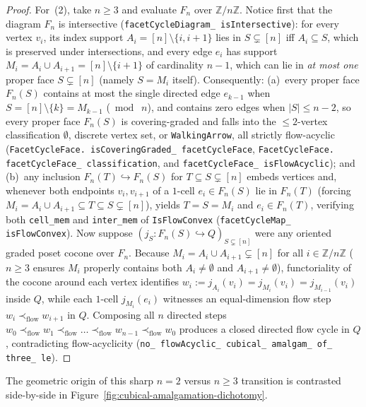 \begin{proof}
For~(2), take $n \ge 3$ and evaluate $F_n$ over $\mathbb{Z}/n\mathbb{Z}$. Notice first that the diagram $F_n$ is intersective (\texttt{facetCycleDiagram\_ isIntersective}): for every vertex $v_i$, its index support $A_i = [n] \setminus \{i, i+1\}$ lies in $S \subsetneq [n]$ iff $A_i \subseteq S$, which is preserved under intersections, and every edge $e_i$ has support $M_i = A_i \cup A_{i+1} = [n] \setminus \{i+1\}$ of cardinality $n - 1$, which can lie in \emph{at most one} proper face $S \subsetneq [n]$ (namely $S = M_i$ itself). Consequently: (a)~every proper face $F_n(S)$ contains at most the single directed edge $e_{k-1}$ when $S = [n] \setminus \{k\} = M_{k-1}$ ($\bmod\; n$), and contains zero edges when $|S| \le n - 2$, so every proper face $F_n(S)$ is covering-graded and falls into the $\le 2$-vertex classification $\emptyset$, discrete vertex set, or \texttt{WalkingArrow}, all strictly flow-acyclic (\texttt{FacetCycleFace. isCoveringGraded\_ facetCycleFace}, \texttt{FacetCycleFace. facetCycleFace\_ classification}, and \texttt{facetCycleFace\_ isFlowAcyclic}); and (b)~any inclusion $F_n(T) \hookrightarrow F_n(S)$ for $T \subseteq S \subsetneq [n]$ embeds vertices and, whenever both endpoints $v_i, v_{i+1}$ of a $1$-cell $e_i \in F_n(S)$ lie in $F_n(T)$ (forcing $M_i = A_i \cup A_{i+1} \subseteq T \subseteq S \subsetneq [n]$), yields $T = S = M_i$ and $e_i \in F_n(T)$, verifying both \texttt{cell\_mem} and \texttt{inter\_mem} of \texttt{IsFlowConvex} (\texttt{facetCycleMap\_ isFlowConvex}). Now suppose $(j_S : F_n(S) \hookrightarrow Q)_{S \subsetneq [n]}$ were any oriented graded poset cocone over $F_n$. Because $M_i = A_i \cup A_{i+1} \subsetneq [n]$ for all $i \in \mathbb{Z}/n\mathbb{Z}$ ($n \ge 3$ ensures $M_i$ properly contains both $A_i \neq \emptyset$ and $A_{i+1} \neq \emptyset$), functoriality of the cocone around each vertex identifies $w_i := j_{A_i}(v_i) = j_{M_i}(v_i) = j_{M_{i-1}}(v_i)$ inside $Q$, while each $1$-cell $j_{M_i}(e_i)$ witnesses an equal-dimension flow step $w_i \prec_{\mathrm{flow}} w_{i+1}$ in $Q$. Composing all $n$ directed steps $w_0 \prec_{\mathrm{flow}} w_1 \prec_{\mathrm{flow}} \dots \prec_{\mathrm{flow}} w_{n-1} \prec_{\mathrm{flow}} w_0$ produces a closed directed flow cycle in $Q$, contradicting flow-acyclicity (\texttt{no\_ flowAcyclic\_ cubical\_ amalgam\_ of\_ three\_ le}).
\end{proof}

The geometric origin of this sharp $n = 2$ versus $n \ge 3$ transition is contrasted side-by-side in Figure~\ref{fig:cubical-amalgamation-dichotomy}.

